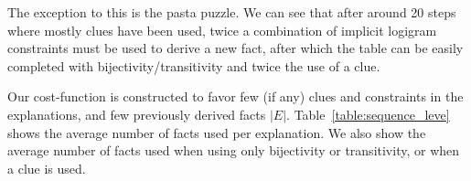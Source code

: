 The exception to this is the pasta puzzle. We can see that after around 20 steps where mostly clues have been used, twice a combination of implicit logigram constraints must be used to derive a new fact, after which the table can be easily completed with bijectivity/transitivity and twice the use of a clue.

\begin{table}
	\centering
	\caption{Puzzle explanation cost based on the cost function $f(I, C)$ and statistics on puzzle constraints}
	\label{table:sequence_leve}
\end{table}

Our cost-function is constructed to favor few (if any) clues and constraints in the explanations, and few previously derived facts $|E|$. Table~\ref{table:sequence_leve} shows the average number of facts used per explanation. We also show the average number of facts used when using only bijectivity or transitivity, or when a clue is used.\setlength{\parskip}{0pt}


